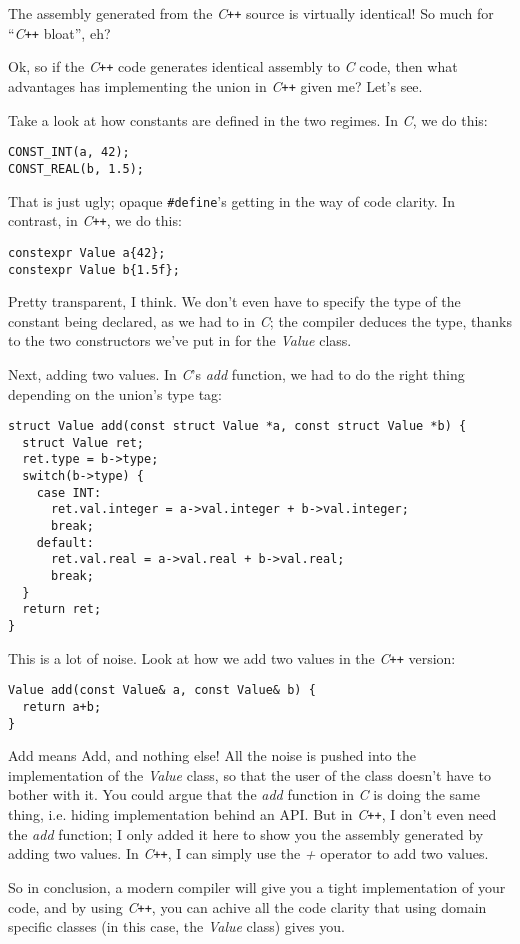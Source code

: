 \documentclass{article}
\begin{document}
The assembly generated from the \emph{C\texttt{++}} source is virtually identical! 
So much for “\emph{C\texttt{++}} bloat”, eh?

Ok, so if the \emph{C\texttt{++}} code generates identical assembly to \emph{C} 
code, then what advantages has implementing the union in \emph{C\texttt{++}} given 
me? Let’s see.

Take a look at how constants are defined in the two regimes. In \emph{C}, we do 
this:

\begin{lstlisting}
CONST_INT(a, 42);
CONST_REAL(b, 1.5);
\end{lstlisting}

That is just ugly; opaque \lstinline|#define|'s getting in the way of code 
clarity. In contrast, in \emph{C\texttt{++}}, we do this:

\begin{lstlisting}
constexpr Value a{42};
constexpr Value b{1.5f};
\end{lstlisting}

Pretty transparent, I think. We don’t even have to specify the type of the 
constant being declared, as we had to in \emph{C}; the compiler deduces the type, 
thanks to the two constructors we’ve put in for the \emph{Value} class.

Next, adding two values. In \emph{C}’s \emph{add} function, we had to do the right 
thing depending on the union’s type tag:

\begin{lstlisting}
struct Value add(const struct Value *a, const struct Value *b) {
  struct Value ret;
  ret.type = b->type;
  switch(b->type) {
    case INT: 
      ret.val.integer = a->val.integer + b->val.integer;
      break;
    default:
      ret.val.real = a->val.real + b->val.real;
      break;
  }
  return ret;
}
\end{lstlisting}

This is a lot of noise. Look at how we add two values in the \emph{C\texttt{++}} 
version:

\begin{lstlisting}
Value add(const Value& a, const Value& b) {
  return a+b;
}
\end{lstlisting}

Add means Add, and nothing else! All the noise is pushed into the implementation 
of the \emph{Value} class, so that the user of the class doesn’t have to bother 
with it. You could argue that the \emph{add} function in \emph{C} is doing the 
same thing, i.e. hiding implementation behind an API. But in \emph{C\texttt{++}}, 
I don’t even need the \emph{add} function; I only added it here to show you the 
assembly generated by adding two values. In \emph{C\texttt{++}}, I can simply use 
the \emph{+} operator to add two values.

So in conclusion, a modern compiler will give you a tight implementation of your 
code, and by using \emph{C\texttt{++}}, you can achive all the code clarity that 
using domain specific classes (in this case, the \emph{Value} class) gives you.
\end{document}
